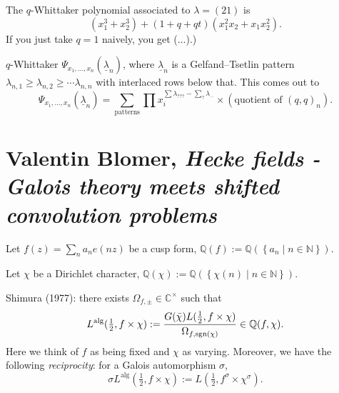 \documentclass[reqno]{amsart} 
\begin{document}
\begin{example}
  The $q$-Whittaker polynomial associated to $\lambda =(2 1)$ is
  \begin{equation*}
    (x_1^3 + x_2^3) +(1 + q + q t)(x_1^2 x_2 + x_1 x_2^2).
  \end{equation*}
  If you just take $q = 1$ naively, you get (...).)
\end{example}

$q$-Whittaker $\Psi_{x_1, \dotsc, x_n}(\underline{\lambda}_n)$, where $\underline{\lambda}_n$ is a Gelfand--Tsetlin pattern $\lambda_{n, 1} \geq \lambda_{n, 2} \geq \dotsb \lambda_{n, n}$ with interlaced rows below that.  This comes out to
\begin{equation*}
  \Psi_{x_1, \dotsc, x_n}(\underline{\lambda}_n) = \sum_{\text{patterns}} \prod x_i^{\sum \lambda_{???} - \sum_{?}\lambda_{\dotsb}}
  \times(\text{quotient of }(q, q)_n).
\end{equation*}


\section{Valentin Blomer, \emph{Hecke fields - Galois theory meets shifted convolution problems}}

Let $f(z) = \sum_n a_n e(n z)$ be a cusp form, $\mathbb{Q}(f) := \mathbb{Q}(\left\{ a_n \mid n \in \mathbb{N}  \right\})$.

Let $\chi$ be a Dirichlet character, $\mathbb{Q}(\chi) := \mathbb{Q}(\left\{ \chi(n) \mid n \in \mathbb{N} \right\})$.

Shimura (1977): there exists $\Omega_{f, \pm} \in \mathbb{C}^\times$ such that
\begin{equation*}
  L^{\mathrm{alg}}(\tfrac{1}{2}, f \times \chi)
  :=
  \frac{G(\bar{\chi}) L(\tfrac{1}{2}, f \times \chi)}{\Omega_{f, \operatorname{sgn}(\chi)}}
  \in \mathbb{Q}(f, \chi).
\end{equation*}
Here we think of $f$ as being fixed and $\chi$ as varying.  Moreover, we have the following \emph{reciprocity}: for a Galois automorphism $\sigma$,
\begin{equation*}
  \sigma L^{\mathrm{alg}}(\tfrac{1}{2}, f \times \chi)
  := L(\tfrac{1}{2}, f^\sigma \times \chi^\sigma).
\end{equation*}
\end{document}
